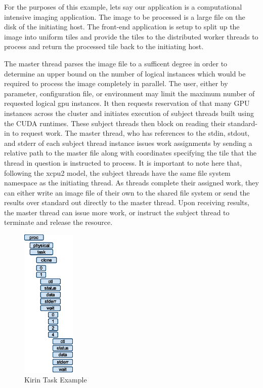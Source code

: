 \documentclass{sig-alternate}
\begin{document}
For the purposes of this example, lets say our application is a computational
intensive imaging application.  The image to be processed is a large file on
the disk of the initiating host.  The front-end application is setup to 
split up the image into uniform tiles and provide the tiles to the distributed
worker threads to process and return the processed tile back to the initiating
host.

The master thread parses the image file to a sufficent degree in order to
determine an upper bound on the number of logical instances which would be
required to process the image completely in parallel.  The user, either
by parameter, configuration file, or environment may limit the maximum
number of requested logical gpu instances.  It then requests reservation of 
that many GPU instances across the cluster and initiates execution of
subject threads built using the CUDA runtimes.  These subject threads then
block on reading their standard-in to request work.  The master thread, who
has references to the stdin, stdout, and stderr of each subject thread instance
issues work assignments by sending a relative path to the master file along 
with coordinates specifying the tile that the thread in question is instructed
to process.  It is important to note here that, following the xcpu2 model, the
subject threads have the same file system namespace as the initiating thread.  
As threads complete their assigned work, they can either write
an image file of their own to the shared file system or send the results over
standard out directly to the master thread.  Upon receiving results, the
master thread can issue more work, or instruct the subject thread to terminate
and release the resource.

\begin{figure}[h]
\begin{center}
\includegraphics[width=1in, keepaspectratio]{kirin-proc.eps}
\end{center}
\caption{Kirin Task Example}
\label{fig:kirin}
\end{figure}
\end{document}

